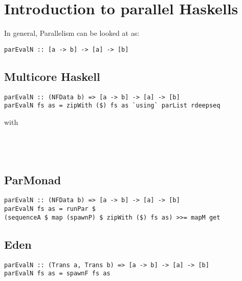 \section{Introduction to parallel Haskells}
In general, Parallelism can be looked at as:
\begin{lstlisting}[frame=htrbl]
parEvalN :: [a -> b] -> [a] -> [b]
\end{lstlisting}

\frbreak

\subsection{Multicore Haskell}
\begin{lstlisting}[frame=htrbl]
parEvalN :: (NFData b) => [a -> b] -> [a] -> [b]
parEvalN fs as = zipWith ($) fs as `using` parList rdeepseq
\end{lstlisting}
with
\\~\\
\\
\\


\frbreak

\subsection{ParMonad}
\begin{lstlisting}[frame=htrbl]
parEvalN :: (NFData b) => [a -> b] -> [a] -> [b]
parEvalN fs as = runPar $ 
(sequenceA $ map (spawnP) $ zipWith ($) fs as) >>= mapM get
\end{lstlisting}

\frbreak

\subsection{Eden}
\begin{lstlisting}[frame=htrbl]
parEvalN :: (Trans a, Trans b) => [a -> b] -> [a] -> [b]
parEvalN fs as = spawnF fs as
\end{lstlisting}